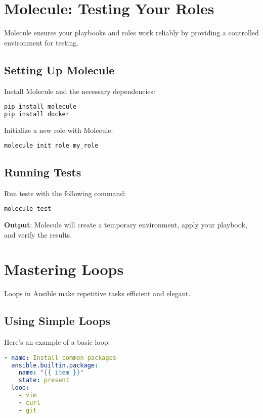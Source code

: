 \section{Molecule: Testing Your Roles}

Molecule ensures your playbooks and roles work reliably by providing a controlled environment for testing.

\subsection{Setting Up Molecule}

Install Molecule and the necessary dependencies:
\begin{lstlisting}[language=bash, caption=Installing Molecule]
pip install molecule
pip install docker
\end{lstlisting}

Initialize a new role with Molecule:
\begin{lstlisting}[language=bash, caption=Initializing a Role for Molecule]
molecule init role my_role
\end{lstlisting}

\subsection{Running Tests}

Run tests with the following command:
\begin{lstlisting}[language=bash, caption=Running Molecule Tests]
molecule test
\end{lstlisting}

\textbf{Output}: Molecule will create a temporary environment, apply your playbook, and verify the results.


\section{Mastering Loops}

Loops in Ansible make repetitive tasks efficient and elegant.

\subsection{Using Simple Loops}

Here's an example of a basic loop:
\begin{lstlisting}[language=yaml, caption=Installing Multiple Packages with Loops]
- name: Install common packages
  ansible.builtin.package:
    name: "{{ item }}"
    state: present
  loop:
    - vim
    - curl
    - git
\end{lstlisting}

